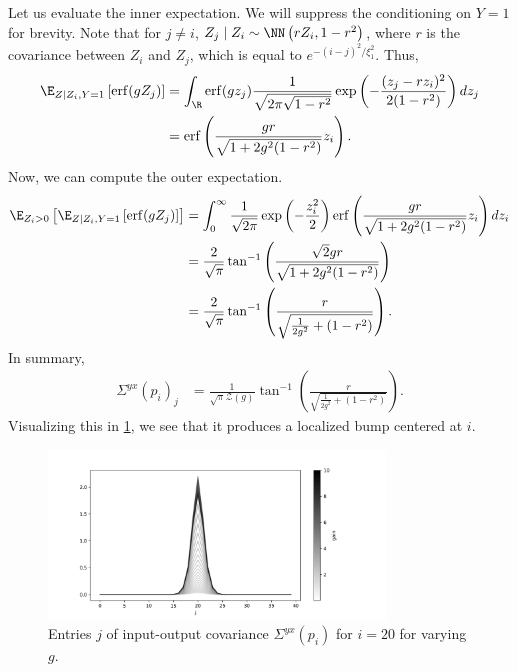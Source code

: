 \documentclass{article}
\begin{document}
Let us evaluate the inner expectation.
We will suppress the conditioning on $Y=1$ for brevity.
Note that for $j \neq i$, $Z_j \mid Z_i \sim \NN\left( r Z_i, 1 - r^2 \right)$, where $r$ is the covariance between $Z_i$ and $Z_j$, which is equal to $e^{-(i-j)^2/\xi_1^2}$.
Thus,
\begin{align}
  \E_{Z \mid Z_i, Y=1} \left[ \operatorname{erf}(g Z_j) \right]
  &= \int_{\R} \operatorname{erf}(g z_j) \frac{1}{\sqrt{2 \pi \sqrt{1 - r^2}}} \exp\left( -\frac{(z_j - r z_i)^2}{2 (1 - r^2)} \right) dz_j \\
  &= \operatorname{erf}\left( \frac{ g r }{ \sqrt{ 1 + 2 g^2 (1-r^2) } } z_i \right).
\end{align}
Now, we can compute the outer expectation.
\begin{align}
  \E_{ Z_i > 0 } \left[ \E_{ Z \mid Z_i, Y=1 } \left[ \operatorname{erf}( g Z_j ) \right] \right]
  &= \int_0^\infty \frac{1}{\sqrt{2 \pi}} \exp\left( -\frac{z_i^2}{2} \right) \operatorname{erf}\left( \frac{ g r }{ \sqrt{ 1 + 2 g^2 (1-r^2) } } z_i \right) dz_i \\
  &= \frac{2}{\sqrt{\pi}} \tan^{-1} \left( \frac{ \sqrt{2} g r }{ \sqrt{ 1 + 2 g^2 (1-r^2) } } \right) \\
  &= \frac{2}{\sqrt{\pi}} \tan^{-1} \left( \frac{ r }{ \sqrt{ \frac{1}{2g^2} + (1-r^2) } } \right).
\end{align}
In summary,
\begin{align}
  \Sigma^{yx}(p_i)_j
  &= \frac{1}{\sqrt{\pi} \mathcal{Z}(g)} \tan^{-1} \left( \frac{ r }{ \sqrt{ \frac{1}{2g^2} + (1-r^2) } } \right).
\end{align}
Visualizing this in \cref{fig:sigma_yx}, we see that it produces a localized bump centered at $i$.
\begin{figure}
  \centering
  \includegraphics[width=0.8\textwidth]{../figs/math/sigma_yx.png}
  \caption{Entries $j$ of input-output covariance $\Sigma^{yx}(p_i)$ for $i=20$ for varying $g$.}
  \label{fig:sigma_yx}
\end{figure}
\end{document}
